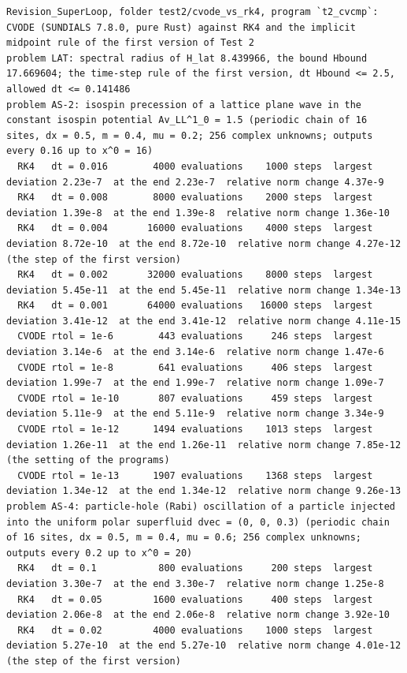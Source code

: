 \documentclass[
  10pt,
]{article}
\begin{document}
\begin{verbatim}
Revision_SuperLoop, folder test2/cvode_vs_rk4, program `t2_cvcmp`: CVODE (SUNDIALS 7.8.0, pure Rust) against RK4 and the implicit midpoint rule of the first version of Test 2
problem LAT: spectral radius of H_lat 8.439966, the bound Hbound 17.669604; the time-step rule of the first version, dt Hbound <= 2.5, allowed dt <= 0.141486
problem AS-2: isospin precession of a lattice plane wave in the constant isospin potential Av_LL^1_0 = 1.5 (periodic chain of 16 sites, dx = 0.5, m = 0.4, mu = 0.2; 256 complex unknowns; outputs every 0.16 up to x^0 = 16)
  RK4   dt = 0.016        4000 evaluations    1000 steps  largest deviation 2.23e-7  at the end 2.23e-7  relative norm change 4.37e-9
  RK4   dt = 0.008        8000 evaluations    2000 steps  largest deviation 1.39e-8  at the end 1.39e-8  relative norm change 1.36e-10
  RK4   dt = 0.004       16000 evaluations    4000 steps  largest deviation 8.72e-10  at the end 8.72e-10  relative norm change 4.27e-12  (the step of the first version)
  RK4   dt = 0.002       32000 evaluations    8000 steps  largest deviation 5.45e-11  at the end 5.45e-11  relative norm change 1.34e-13
  RK4   dt = 0.001       64000 evaluations   16000 steps  largest deviation 3.41e-12  at the end 3.41e-12  relative norm change 4.11e-15
  CVODE rtol = 1e-6        443 evaluations     246 steps  largest deviation 3.14e-6  at the end 3.14e-6  relative norm change 1.47e-6
  CVODE rtol = 1e-8        641 evaluations     406 steps  largest deviation 1.99e-7  at the end 1.99e-7  relative norm change 1.09e-7
  CVODE rtol = 1e-10       807 evaluations     459 steps  largest deviation 5.11e-9  at the end 5.11e-9  relative norm change 3.34e-9
  CVODE rtol = 1e-12      1494 evaluations    1013 steps  largest deviation 1.26e-11  at the end 1.26e-11  relative norm change 7.85e-12  (the setting of the programs)
  CVODE rtol = 1e-13      1907 evaluations    1368 steps  largest deviation 1.34e-12  at the end 1.34e-12  relative norm change 9.26e-13
problem AS-4: particle-hole (Rabi) oscillation of a particle injected into the uniform polar superfluid dvec = (0, 0, 0.3) (periodic chain of 16 sites, dx = 0.5, m = 0.4, mu = 0.6; 256 complex unknowns; outputs every 0.2 up to x^0 = 20)
  RK4   dt = 0.1           800 evaluations     200 steps  largest deviation 3.30e-7  at the end 3.30e-7  relative norm change 1.25e-8
  RK4   dt = 0.05         1600 evaluations     400 steps  largest deviation 2.06e-8  at the end 2.06e-8  relative norm change 3.92e-10
  RK4   dt = 0.02         4000 evaluations    1000 steps  largest deviation 5.27e-10  at the end 5.27e-10  relative norm change 4.01e-12  (the step of the first version)

\end{verbatim}
\end{document}
